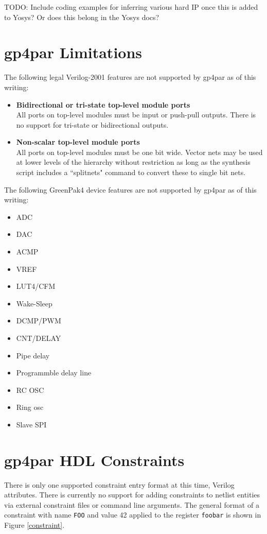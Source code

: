 \documentclass{article}
\begin{document}
TODO: Include coding examples for inferring various hard IP once this is added to Yosys?
Or does this belong in the Yosys docs?

\pagebreak
\section{gp4par Limitations}

The following legal Verilog-2001 features are not supported by gp4par as of this writing:

\begin{itemize}
\item {\bfseries Bidirectional or tri-state top-level module ports}\\All ports on top-level modules must be input or 
push-pull outputs. There is no support for tri-state or bidirectional outputs.
\item {\bfseries Non-scalar top-level module ports}\\All ports on top-level modules must be one bit wide. Vector nets 
may be used at lower levels of the hierarchy without restriction as long as the synthesis script includes a
``splitnets" command to convert these to single bit nets.
\end{itemize}

The following GreenPak4 device features are not supported by gp4par as of this writing:

\begin{itemize}
\item ADC
\item DAC
\item ACMP
\item VREF
\item LUT4/CFM
\item Wake-Sleep
\item DCMP/PWM
\item CNT/DELAY
\item Pipe delay
\item Programmble delay line
\item RC OSC
\item Ring osc
\item Slave SPI
\end{itemize}

\pagebreak
\section{gp4par HDL Constraints}

There is only one supported constraint entry format at this time, Verilog attributes. There is currently no support for 
adding constraints to netlist entities via external constraint files or command line arguments. The general format of a 
constraint with name \texttt{FOO} and value 42 applied to the register \texttt{foobar} is shown in Figure 
\ref{constraint}.
\end{document}
